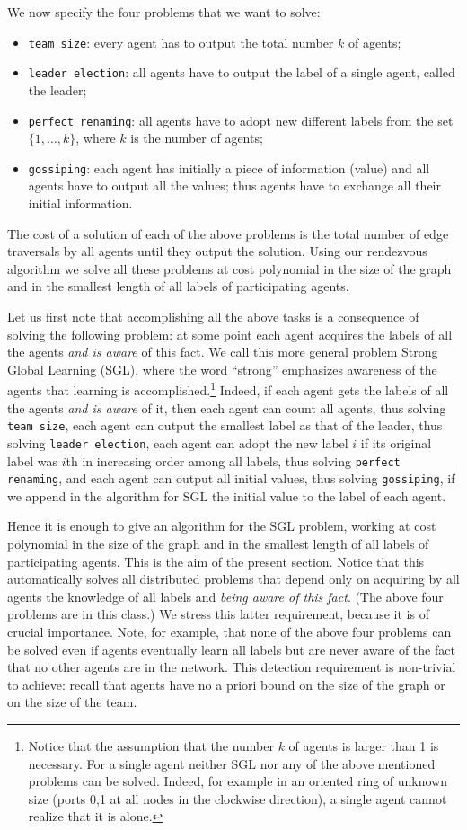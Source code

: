\documentclass [11pt] {article}
\begin{document}
We now specify the four problems that we want to solve:
\begin{itemize}
\item
{\tt team size}: every agent has to output the total
number $k$ of agents; 
\item{\tt leader election}: all agents have to output the label of a single agent, called the leader;
\item
{\tt perfect renaming}: all agents
have to adopt new different labels from the set $\{1,\dots,k\}$, where $k$ is the number of agents;  
\item
{\tt gossiping}:  each agent has initially a piece of information (value) and all agents have to output all the values; thus agents have to exchange
all their initial information.
\end{itemize} 
The cost of a solution of each of the above problems is the total number of edge traversals by all agents until they output the solution.
Using our rendezvous algorithm we solve all these problems at cost polynomial in the size of the graph and in the smallest length of all labels of participating agents. 

Let us first note that accomplishing all the above tasks is a consequence of solving the following problem: 
at some point each agent acquires the labels of all the agents {\em and is aware} of this fact. We call this more general problem Strong Global Learning (SGL), where the word ``strong''  emphasizes awareness of the agents that learning is accomplished.\footnote{Notice that the assumption that the number $k$ of agents is larger than 1 is necessary. For a single agent neither SGL nor any of the above mentioned problems can be solved. Indeed,
for example in an oriented ring of unknown size (ports 0,1 at all nodes in the clockwise direction), a single agent cannot realize that it is alone.}
Indeed, if each agent gets the labels of all the agents {\em and is aware} of it, then each agent can count all agents, thus solving
{\tt team size}, each agent can output the smallest label as that of the leader, thus solving {\tt leader election},  each agent can adopt the new label
$i$ if its original label was $i$th in increasing order among all labels, 
thus solving {\tt perfect renaming}, and each agent can output all initial values,
thus solving {\tt gossiping},  if we append in the algorithm for SGL the initial value to the label of each agent.

Hence it is enough to give an algorithm for the SGL problem, working at cost polynomial in the size of the graph 
and in the smallest length of all labels of participating agents. This is the aim of the present section. Notice that this automatically solves all
distributed problems that depend only on acquiring by all agents the knowledge of all labels and {\em being aware of this fact}.
(The above four problems are in this class.) We stress this latter requirement, because it is of crucial importance. Note, for example, that none of the above four problems can be solved even if agents
eventually learn all
labels but are never aware of the fact that no other agents are in the network. 
This detection requirement is non-trivial to achieve: recall that agents have 
no a priori bound on the size of the graph or on the size of the team. 
\end{document}

